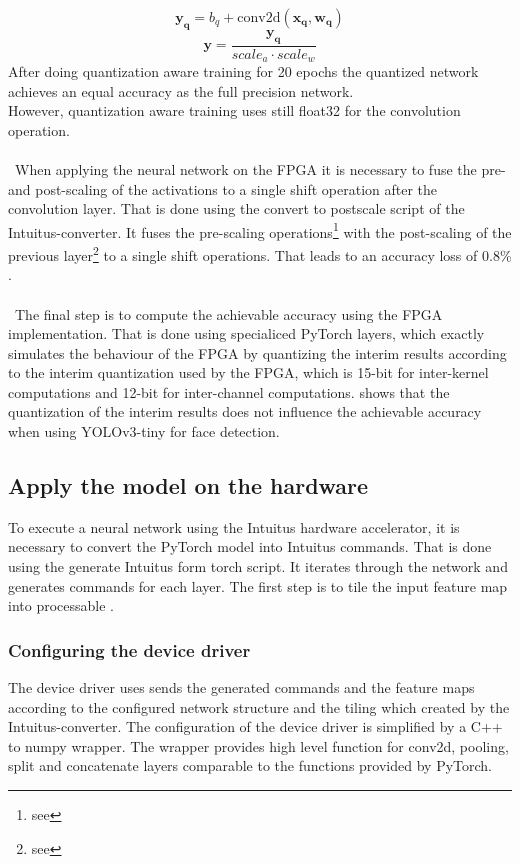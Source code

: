 \documentclass[%
a4paper,
twoside,
openany,
dvipsnames
]
{report}
\begin{document}
	\begin{equation} \label{eq:conv-q}
		\mathbf{y_q} = b_q + \text{conv2d}(\mathbf{x_q},\mathbf{w_q})  
	\end{equation}
	\begin{equation} \label{eq:y-q}
		\mathbf{y} = \frac{\mathbf{y_q}}{scale_a \cdot scale_w }
	\end{equation}
	After doing quantization aware training for 20 epochs the quantized network achieves an equal accuracy as the full precision network. \\
	However, quantization aware training uses still float32 for the convolution operation. \\
	\\\
	When applying the neural network on the \gls{FPGA} it is necessary to fuse the pre- and post-scaling of the activations to a single shift operation after the convolution layer. That is done using the convert to postscale script of the Intuitus-converter. It fuses the pre-scaling operations\footnote{see } with the post-scaling of the previous layer\footnote{see } to a single shift operations. That leads to an accuracy loss of $0.8\%$. \\
	\\\
	The final step is to compute the achievable accuracy using the \gls{FPGA} implementation. That is done using specialiced PyTorch layers, which exactly simulates the behaviour of the \gls{FPGA} by quantizing the interim results according to the interim quantization used by the \gls{FPGA}, which is 15-bit for inter-kernel computations and 12-bit for inter-channel computations. \Cref{tab:quantization-tasks} shows that the quantization of the interim results does not influence the achievable accuracy when using YOLOv3-tiny for face detection.   
	
	\subsection{Apply the model on the hardware}
	To execute a neural network using the Intuitus hardware accelerator, it is necessary to convert the PyTorch model into Intuitus commands. That is done using the generate Intuitus form torch script. It iterates through the network and generates commands for each layer. The first step is to tile the input feature map into processable .
	
	\subsubsection{Configuring the device driver}
	The device driver uses sends the generated commands and the feature maps according to the configured network structure and the tiling which created by the Intuitus-converter. The configuration of the device driver is simplified by a C++ to numpy wrapper. The wrapper provides high level function for conv2d, pooling, split and concatenate layers comparable to the functions provided by PyTorch. \\
	
\end{document}
